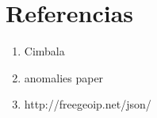 \section{Referencias}

\begin{enumerate}
\item Cimbala
\item anomalies paper
\item http://freegeoip.net/json/
\end{enumerate}

